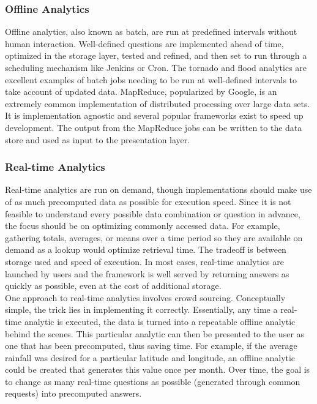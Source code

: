 \subsubsection{Offline Analytics}
Offline analytics, also known as batch, are run at predefined intervals without human interaction. Well-defined questions are implemented ahead of time, optimized in the storage layer, tested and refined, and then set to run through a scheduling mechanism like Jenkins or Cron. The tornado and flood analytics are excellent examples of batch jobs needing to be run at well-defined intervals to take account of updated data. MapReduce, popularized by Google, is an extremely common implementation of distributed processing over large data sets. It is implementation agnostic and several popular frameworks exist to speed up development. The output from the MapReduce jobs can be written to the data store and used as input to the presentation layer.
\subsubsection{Real-time Analytics}
Real-time analytics are run on demand, though implementations should make use of as much precomputed data as possible for execution speed. Since it is not feasible to understand every possible data combination or question in advance, the focus should be on optimizing commonly accessed data. For example, gathering totals, averages, or means over a time period so they are available on demand as a lookup would optimize retrieval time. The tradeoff is between storage used and speed of execution. In most cases, real-time analytics are launched by users and the framework is well served by returning answers as quickly as possible, even at the cost of additional storage.\\

One approach to real-time analytics involves crowd sourcing. Conceptually simple, the trick lies in implementing it correctly. Essentially, any time a real-time analytic is executed, the data is turned into a repeatable offline analytic behind the scenes. This particular analytic can then be presented to the user as one that has been precomputed, thus saving time. For example, if the average rainfall was desired for a particular latitude and longitude, an offline analytic could be created that generates this value once per month. Over time, the goal is to change as many real-time questions as possible (generated through common requests) into precomputed answers.
